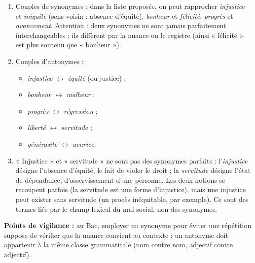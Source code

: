 \documentclass[11pt]{article}
\begin{document}
\begin{corrige}

\begin{enumerate}
\item Couples de synonymes : dans la liste proposée, on peut rapprocher \emph{injustice} et \emph{iniquité} (sens voisin : absence d'équité), \emph{bonheur} et \emph{félicité}, \emph{progrès} et \emph{avancement}. Attention : deux synonymes ne sont jamais parfaitement interchangeables ; ils diffèrent par la nuance ou le registre (ainsi « félicité » est plus soutenu que « bonheur »).

\item Couples d'antonymes :
\begin{itemize}
\item \emph{injustice} $\leftrightarrow$ \emph{équité} (ou justice) ;
\item \emph{bonheur} $\leftrightarrow$ \emph{malheur} ;
\item \emph{progrès} $\leftrightarrow$ \emph{régression} ;
\item \emph{liberté} $\leftrightarrow$ \emph{servitude} ;
\item \emph{générosité} $\leftrightarrow$ \emph{avarice}.
\end{itemize}

\item « Injustice » et « servitude » ne sont pas des synonymes parfaits : l'\emph{injustice} désigne l'absence d'équité, le fait de violer le droit ; la \emph{servitude} désigne l'état de dépendance, d'asservissement d'une personne. Les deux notions se recoupent parfois (la servitude est une forme d'injustice), mais une injustice peut exister sans servitude (un procès inéquitable, par exemple). Ce sont des termes liés par le champ lexical du mal social, non des synonymes.
\end{enumerate}

\textbf{Points de vigilance :} au Bac, employer un synonyme pour éviter une répétition suppose de vérifier que la nuance convient au contexte ; un antonyme doit appartenir à la même classe grammaticale (nom contre nom, adjectif contre adjectif).
\end{corrige}
\end{document}
